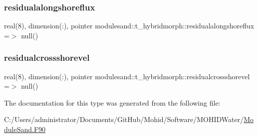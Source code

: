 \subsubsection{\texorpdfstring{residualalongshoreflux}{residualalongshoreflux}}
{\footnotesize\ttfamily real(8), dimension(\+:), pointer modulesand\+::t\+\_\+hybridmorph\+::residualalongshoreflux =$>$ null()\hspace{0.3cm}{\ttfamily [private]}}

\mbox{\label{structmodulesand_1_1t__hybridmorph_a0dce3208e32bf04697d3c8e49cd71c6e}} 
\subsubsection{\texorpdfstring{residualcrossshorevel}{residualcrossshorevel}}
{\footnotesize\ttfamily real(8), dimension(\+:), pointer modulesand\+::t\+\_\+hybridmorph\+::residualcrossshorevel =$>$ null()\hspace{0.3cm}{\ttfamily [private]}}



The documentation for this type was generated from the following file\+:\begin{DoxyCompactItemize}
\item 
C\+:/\+Users/administrator/\+Documents/\+Git\+Hub/\+Mohid/\+Software/\+M\+O\+H\+I\+D\+Water/\mbox{\hyperlink{_module_sand_8_f90}{Module\+Sand.\+F90}}\end{DoxyCompactItemize}
